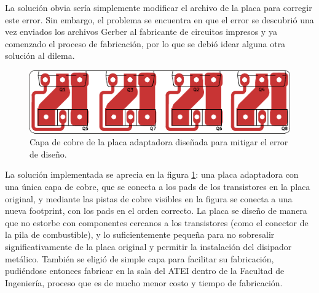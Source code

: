 La solución obvia sería simplemente modificar el archivo de la placa para corregir este error. Sin embargo, el problema se encuentra en que el error se descubrió una vez enviados los archivos Gerber al fabricante de circuitos impresos y ya comenzado el proceso de fabricación, por lo que se debió idear alguna otra solución al dilema.\\

\begin{figure}[h]
    \centering
    \includegraphics[scale=1.3]{Imagenes/Placa Adaptadora.pdf}
    \caption{Capa de cobre de la placa adaptadora diseñada para mitigar el error de diseño.}
    \label{fig:placa_adaptadora}
\end{figure}

La solución implementada se aprecia en la figura \ref{fig:placa_adaptadora}: una placa adaptadora con una única capa de cobre, que se conecta a los pads de los transistores en la placa original, y mediante las pistas de cobre visibles en la figura se conecta a una nueva footprint, con los pads en el orden correcto. La placa se diseño de manera que no estorbe con componentes cercanos a los transistores (como el conector de la pila de combustible), y lo suficientemente pequeña para no sobresalir significativamente de la placa original y permitir la instalación del disipador metálico. También se eligió de simple capa para facilitar su fabricación, pudiéndose entonces fabricar en la sala del ATEI dentro de la Facultad de Ingeniería, proceso que es de mucho menor costo y tiempo de fabricación.\\

